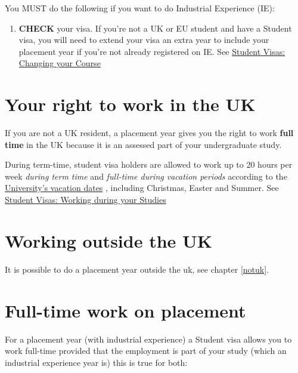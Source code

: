 \documentclass[
]{book}
\providecommand{\tightlist}{%
  \setlength{\itemsep}{0pt}\setlength{\parskip}{0pt}}
\begin{document}
You MUST do the following if you want to do Industrial Experience (IE):

\begin{enumerate}
\def\labelenumi{\arabic{enumi}.}
\tightlist
\item
  \textbf{CHECK} your visa. If you're not a UK or EU student and have a Student visa, you will need to extend your visa an extra year to include your placement year if you're not already registered on IE. See \href{documents.manchester.ac.uk/display.aspx?DocID=37044}{Student Visas: Changing your Course} \citep{changing}
\end{enumerate}

\section{Your right to work in the UK}\label{uk}

If you are not a UK resident, a placement year gives you the right to work \textbf{full time} in the UK because it is an assessed part of your undergraduate study. \citep{righttowork, workingduringstudy}

During term-time, student visa holders are allowed to work up to 20 hours per week \emph{during term time} and \emph{full-time during vacation periods} according to the \href{https://www.manchester.ac.uk/discover/key-dates}{University's vacation dates} \citep{keydates}, including Christmas, Easter and Summer. See \href{https://www.studentsupport.manchester.ac.uk/immigration-and-visas/working/working-during-your-studies/}{Student Visas: Working during your Studies} \citep{workingduringstudy}

\section{Working outside the UK}\label{working-outside-the-uk}

It is possible to do a placement year outside the uk, see chapter \ref{notuk}.

\section{Full-time work on placement}\label{full-time-work-on-placement}

For a placement year (with industrial experience) a Student visa allows you to work full-time provided that the employment is part of your study (which an industrial experience year is) this is true for both:
\end{document}
